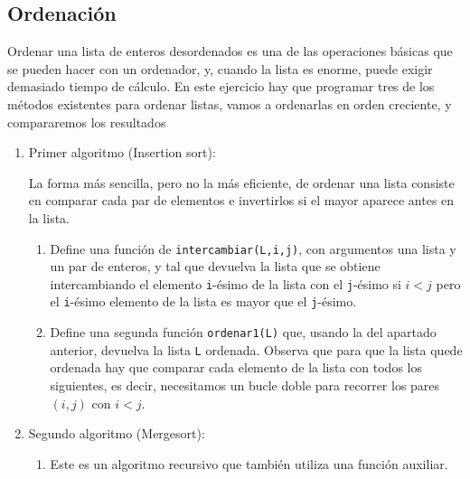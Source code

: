 \subsection{Ordenaci\'on}\label{ordenacion}
Ordenar una lista de enteros desordenados es una de las operaciones b\'asicas
que se pueden hacer con un ordenador, y, cuando la lista es enorme, puede exigir
demasiado tiempo de c\'alculo. En este ejercicio hay que programar tres de
los m\'etodos existentes para ordenar listas, vamos a ordenarlas en orden
creciente, y compararemos los resultados




\begin{enumerate}
\item {\sc Primer algoritmo (Insertion sort):}

\medskip

La forma m\'as sencilla, pero no la m\'as eficiente,  de ordenar una lista consiste en comparar cada par de elementos e invertirlos si el mayor aparece antes en la lista. 

\begin{ejer}
\begin{enumerate}
\item Define una funci\'on de {\sage} {\tt intercambiar(L,i,j)}, con argumentos
una
lista y un par de enteros, y tal que devuelva la lista que se obtiene
intercambiando el elemento {\tt i}-\'esimo de la lista con el
{\tt j}-\'esimo si $i<j$ pero el {\tt i}-\'esimo elemento de la lista es mayor que el
{\tt j}-\'esimo. %
\item Define una segunda funci\'on {\tt ordenar1(L)} que, usando
la del apartado anterior, devuelva la lista {\tt L} ordenada. Observa que para
que la lista quede ordenada hay que comparar cada elemento de la lista con {\sc
todos} los siguientes, es decir, necesitamos un bucle doble para recorrer los pares $(i,j)$ con $i<j$.
\end{enumerate}
\end{ejer}
\item \label{mergesort}{\sc Segundo algoritmo (Mergesort):}

\begin{ejer}
\begin{enumerate}
\item Este es un algoritmo recursivo que tambi\'en utiliza una funci\'on
auxiliar. 


\end{enumerate}
\end{ejer}
\end{enumerate}
